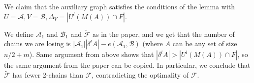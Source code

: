 \documentclass[11pt]{amsart}
\theoremstyle{definition}
\theoremstyle{remark}
\newcommand{\F}{\mathcal{F}}
\newcommand{\A}{\mathcal{A}}
\newcommand{\B}{\mathcal{B}}
\begin{document}
We claim that the auxiliary graph satisfies the conditions of the lemma with $U = \A, V = \B, \Delta_V = |U^l(M(A)) \cap F|$.

We define $\A_1$ and $\B_1$ and $\tilde{\F}$ as in the paper, and we get that the number of chains we are losing is $|\A_1||\delta^l A| - e(\A_1,\B)$ (where $A$ can be any set of size $n/2 + m$). Same argument from above shows that $|\delta^l A| > |U^l(M(A)) \cap F|$, so the same argument from the paper can be copied. In particular, we conclude that $\tilde{\F}$ has fewer 2-chains than $\F$, contradicting the optimality of $\F$.
\end{document}

